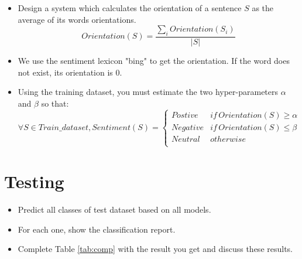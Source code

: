 \documentclass[11pt, a4paper]{article}
\begin{document}
\begin{itemize}
	\item Design a system which calculates the orientation of a sentence $S$ as the average of its words orientations. 
	\[Orientation(S) = \frac{\sum_i Orientation(S_i)}{|S|}\]
	\item We use the sentiment lexicon "bing" to get the orientation. If the word does not exist, its orientation is 0.
	\item Using the training dataset, you must estimate the two hyper-parameters $\alpha$ and $\beta$ so that:
	\[\forall S \in Train\_dataset, Sentiment(S) = 
	\begin{cases}
		Postive & if\,  Orientation(S) \ge \alpha \\
		Negative & if\,  Orientation(S) \le \beta \\
		Neutral & otherwise  \\
	\end{cases}
	\]
\end{itemize}

\section{Testing}

\begin{itemize}
	\item Predict all classes of test dataset based on all models.
	\item For each one, show the classification report.
	\item Complete Table \ref{tab:comp} with the result you get and discuss these results.
\end{itemize}
\end{document}
